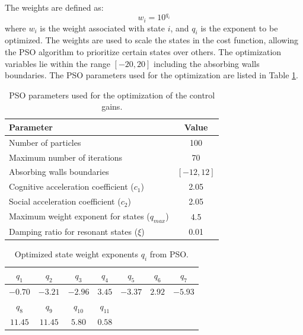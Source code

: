The weights are defined as:
\begin{equation}
    w_i = 10^{q_i}
\end{equation}
where $w_i$ is the weight associated with state $i$, and $q_i$ is the exponent to be optimized. The weights are used to scale the states in the cost function, allowing the PSO algorithm to prioritize certain states over others. The optimization variables lie within the range $[-20,20]$ including the absorbing walls boundaries. The PSO parameters used for the optimization are listed in Table \ref{tab:PSO_Parameters}.

\begin{table}[t!]
    \centering
    \caption{PSO parameters used for the optimization of the control gains.}
    \label{tab:PSO_Parameters}
    \begin{tabular}{|l|c|}
        \hline
        \textbf{Parameter} & \textbf{Value}\\
        \hline\hline
        Number of particles & 100\\
        Maximum number of iterations & 70\\
        Absorbing walls boundaries & $[-12, 12]$\\
        Cognitive acceleration coefficient ($c_1$) & 2.05\\
        Social acceleration coefficient ($c_2$) & 2.05\\
        Maximum weight exponent for states ($q_{max}$) & 4.5\\
        Damping ratio for resonant states ($\xi$) & 0.01\\
        \hline
    \end{tabular}
\end{table}

\begin{table}[h!]
    \centering
    \caption{Optimized state weight exponents $q_i$ from PSO.}
    \label{tab:PSO_Weights}
    \begin{tabular}{|c|c|c|c|c|c|c|}
        \hline
        $q_1$ & $q_2$ & $q_3$ & $q_4$ & $q_5$ & $q_6$ & $q_7$\\
        \hline
        $-0.70$ & $-3.21$ & $-2.96$ & $3.45$ & $-3.37$ & $2.92$ & $-5.93$ \\
        \hline
        $q_8$ & $q_9$ & $q_{10}$ & $q_{11}$ &  &  & \\
        \hline
        $11.45$ & $11.45$ & $5.80$ & $0.58$ &  &  & \\
        \hline
    \end{tabular}
\end{table}

